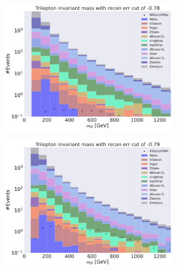 \begin{figure}[H]
    \centering
    \begin{subfigure}{.45\textwidth}
        \includegraphics[width=\textwidth]{Figures/VAE_testing/big/3lep/b_data_recon_big_rm3_feats_sig_800p0p050p_mlll_recon_errcut_-0.78.pdf}
        \caption{ }
        \label{fig:VAE_3lep_big_450_cut_mlll}
    \end{subfigure}
    \hfill
    \begin{subfigure}{.45\textwidth}
        \includegraphics[width=\textwidth]{Figures/VAE_testing/small/3lep/b_data_recon_big_rm3_feats_sig_450p0p0300_mlll_recon_errcut_-0.79.pdf}
        \caption{}
        \label{fig:VAE_3lep_small_450_cut_mlll}
    \end{subfigure}

\end{figure}
